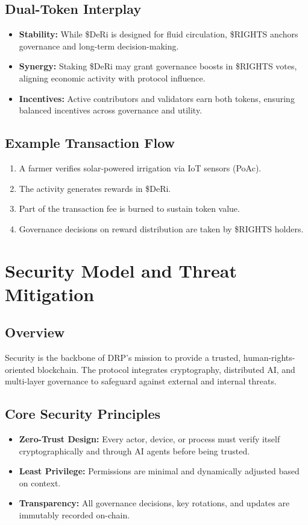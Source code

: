 \documentclass[11pt,a4paper]{article}
\begin{document}
\subsection{Dual-Token Interplay}
\begin{itemize}
    \item \textbf{Stability:} While \$DeRi is designed for fluid circulation, \$RIGHTS anchors governance and long-term decision-making.  
    \item \textbf{Synergy:} Staking \$DeRi may grant governance boosts in \$RIGHTS votes, aligning economic activity with protocol influence.  
    \item \textbf{Incentives:} Active contributors and validators earn both tokens, ensuring balanced incentives across governance and utility.  
\end{itemize}

\subsection{Example Transaction Flow}
\begin{enumerate}
    \item A farmer verifies solar-powered irrigation via IoT sensors (PoAc).  
    \item The activity generates rewards in \$DeRi.  
    \item Part of the transaction fee is burned to sustain token value.  
    \item Governance decisions on reward distribution are taken by \$RIGHTS holders.  
\end{enumerate}

\section{Security Model and Threat Mitigation}

\subsection{Overview}
Security is the backbone of DRP’s mission to provide a trusted, human-rights-oriented blockchain. The protocol integrates cryptography, distributed AI, and multi-layer governance to safeguard against external and internal threats.  

\subsection{Core Security Principles}
\begin{itemize}
    \item \textbf{Zero-Trust Design:} Every actor, device, or process must verify itself cryptographically and through AI agents before being trusted.  
    \item \textbf{Least Privilege:} Permissions are minimal and dynamically adjusted based on context.  
    \item \textbf{Transparency:} All governance decisions, key rotations, and updates are immutably recorded on-chain.  
\end{itemize}
\end{document}
